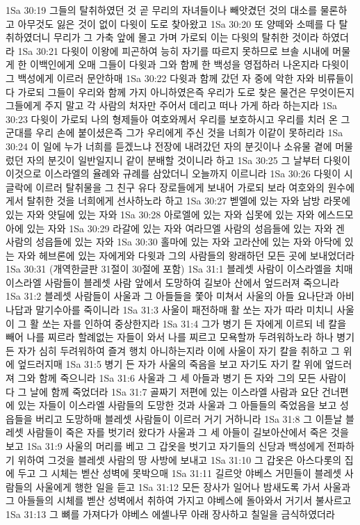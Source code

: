1Sa 30:19  그들의 탈취하였던 것 곧 무리의 자녀들이나 빼앗겼던 것의 대소를 물론하고 아무것도 잃은 것이 없이 다윗이 도로 찾아왔고
1Sa 30:20  또 양떼와 소떼를 다 탈취하였더니 무리가 그 가축 앞에 몰고 가며 가로되 이는 다윗의 탈취한 것이라 하였더라
1Sa 30:21  다윗이 이왕에 피곤하여 능히 자기를 따르지 못하므로 브솔 시내에 머물게 한 이백인에게 오매 그들이 다윗과 그와 함께 한 백성을 영접하러 나온지라 다윗이 그 백성에게 이르러 문안하매
1Sa 30:22  다윗과 함께 갔던 자 중에 악한 자와 비류들이 다 가로되 그들이 우리와 함께 가지 아니하였은즉 우리가 도로 찾은 물건은 무엇이든지 그들에게 주지 말고 각 사람의 처자만 주어서 데리고 떠나 가게 하라 하는지라
1Sa 30:23  다윗이 가로되 나의 형제들아 여호와께서 우리를 보호하시고 우리를 치러 온 그 군대를 우리 손에 붙이셨은즉 그가 우리에게 주신 것을 너희가 이같이 못하리라
1Sa 30:24  이 일에 누가 너희를 듣겠느냐 전장에 내려갔던 자의 분깃이나 소유물 곁에 머물렀던 자의 분깃이 일반일지니 같이 분배할 것이니라 하고
1Sa 30:25  그 날부터 다윗이 이것으로 이스라엘의 율례와 규례를 삼았더니 오늘까지 이르니라
1Sa 30:26  다윗이 시글락에 이르러 탈취물을 그 친구 유다 장로들에게 보내어 가로되 보라 여호와의 원수에게서 탈취한 것을 너희에게 선사하노라 하고
1Sa 30:27  벧엘에 있는 자와 남방 라못에 있는 자와 얏딜에 있는 자와
1Sa 30:28  아로엘에 있는 자와 십못에 있는 자와 에스드모아에 있는 자와
1Sa 30:29  라갈에 있는 자와 여라므엘 사람의 성읍들에 있는 자와 겐 사람의 성읍들에 있는 자와
1Sa 30:30  홀마에 있는 자와 고라산에 있는 자와 아닥에 있는 자와 헤브론에 있는 자에게와 다윗과 그의 사람들의 왕래하던 모든 곳에 보내었더라
1Sa 30:31  (개역한글판 31절이 30절에 포함)
1Sa 31:1  블레셋 사람이 이스라엘을 치매 이스라엘 사람들이 블레셋 사람 앞에서 도망하여 길보아 산에서 엎드러져 죽으니라
1Sa 31:2  블레셋 사람들이 사울과 그 아들들을 쫓아 미쳐서 사울의 아들 요나단과 아비나답과 말기수아를 죽이니라
1Sa 31:3  사울이 패전하매 활 쏘는 자가 따라 미치니 사울이 그 활 쏘는 자를 인하여 중상한지라
1Sa 31:4  그가 병기 든 자에게 이르되 네 칼을 빼어 나를 찌르라 할례없는 자들이 와서 나를 찌르고 모욕할까 두려워하노라 하나 병기 든 자가 심히 두려워하여 즐겨 행치 아니하는지라 이에 사울이 자기 칼을 취하고 그 위에 엎드러지매
1Sa 31:5  병기 든 자가 사울의 죽음을 보고 자기도 자기 칼 위에 엎드러져 그와 함께 죽으니라
1Sa 31:6  사울과 그 세 아들과 병기 든 자와 그의 모든 사람이 다 그 날에 함께 죽었더라
1Sa 31:7  골짜기 저편에 있는 이스라엘 사람과 요단 건너편에 있는 자들이 이스라엘 사람들의 도망한 것과 사울과 그 아들들의 죽었음을 보고 성읍들을 버리고 도망하매 블레셋 사람들이 이르러 거기 거하니라
1Sa 31:8  그 이튿날 블레셋 사람들이 죽은 자를 벗기러 왔다가 사울과 그 세 아들이 길보아산에서 죽은 것을 보고
1Sa 31:9  사울의 머리를 베고 그 갑옷을 벗기고 자기들의 신당과 백성에게 전파하기 위하여 그것을 블레셋 사람의 땅 사방에 보내고
1Sa 31:10  그 갑옷은 아스다롯의 집에 두고 그 시체는 벧산 성벽에 못박으매
1Sa 31:11  길르앗 야베스 거민들이 블레셋 사람들의 사울에게 행한 일을 듣고
1Sa 31:12  모든 장사가 일어나 밤새도록 가서 사울과 그 아들들의 시체를 벧산 성벽에서 취하여 가지고 야베스에 돌아와서 거기서 불사르고
1Sa 31:13  그 뼈를 가져다가 야베스 에셀나무 아래 장사하고 칠일을 금식하였더라


